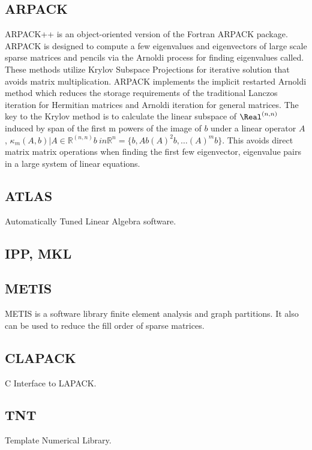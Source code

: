 \subsection{ARPACK}
ARPACK++ is an object-oriented version of the Fortran ARPACK
package. ARPACK is designed to compute a few eigenvalues and
eigenvectors of large scale sparse matrices and pencils via the
Arnoldi process for finding eigenvalues called. These methods
utilize Krylov Subspace Projections for iterative solution that
avoids matrix multiplication.  ARPACK implements the implicit
restarted Arnoldi method which reduces the storage requirements
of the traditional Lanczos iteration for Hermitian matrices and
Arnoldi iteration for general matrices.  The key to the Krylov
method is to calculate the linear subspace of $\Real^{(n,n)}$
induced by span of the first m powers of the image of $b$ under
a linear operator $A$, $\kappa_m(A,b) | A \in \mathbb R^{(n,n)}
b\ in \mathbb R^n = \{b, Ab (A)^2b, \ldots (A)^mb \}$.  This
avoids direct matrix matrix operations when finding the first
few eigenvector, eigenvalue pairs in a large system of linear
equations.

\subsection{ATLAS}
Automatically Tuned Linear Algebra software.
\subsection{IPP, MKL}

\subsection{METIS}
METIS is a software library finite element analysis and graph
partitions.  It also can be used to reduce the fill order of
sparse matrices.

\subsection{CLAPACK}
C Interface to LAPACK.

\subsection{TNT}
Template Numerical Library.

